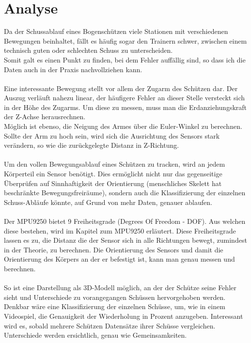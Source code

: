 \section{Analyse}
Da der Schussablauf eines Bogenschützen viele Stationen mit verschiedenen Bewegungen 
beinhaltet, fällt es häufig sogar den Trainern schwer, zwischen einem technisch guten
oder schlechten Schuss zu unterscheiden.\\ 
Somit galt es einen Punkt zu finden, bei dem Fehler auffällig sind, so dass ich die Daten auch in 
der Praxis nachvollziehen kann.\\
\\
Eine interessante Bewegung stellt vor allem der Zugarm des 
Schützen dar. Der Auszug verläuft nahezu linear, der häufigere Fehler 
an dieser Stelle versteckt sich in der Höhe des Zugarms. 
Um diese zu messen, muss man die Erdanziehungskraft der Z-Achse herausrechnen.\\
Möglich ist ebenso, die Neigung des Armes über die Euler-Winkel zu berechnen. Sollte 
der Arm zu hoch sein, wird sich die Ausrichtung des Sensors stark verändern, so wie 
die zurückgelegte Distanz in Z-Richtung.\\
\\
Um den vollen Bewegungsablauf eines Schützen zu tracken, wird an jedem Körperteil ein Sensor
benötigt. Dies ermöglicht nicht nur das gegenseitige Überprüfen auf Sinnhaftigkeit der Orientierung
(menschliches Skelett hat beschränkte Bewegungsfreiräume), sondern auch die Klassifizierung der 
einzelnen Schuss-Abläufe könnte, auf Grund von mehr Daten, genauer ablaufen.\\ 
\\
Der MPU9250 bietet 9 Freiheitsgrade (Degrees Of Freedom - DOF). Aus welchen diese bestehen, wird
im Kapitel zum MPU9250 erläutert. Diese Freiheitsgrade lassen es zu, die Distanz
die der Sensor sich in alle Richtungen bewegt, zumindest in der Theorie, zu berechnen. Die Orientierung des Sensors 
und damit die Orientierung des Körpers an der er befestigt ist, kann man genau messen und berechnen. \\
\\
So ist eine Darstellung als 3D-Modell möglich, an der der Schütze seine Fehler sieht und Unterschiede
zu vorangegangen Schüssen hervorgehoben werden. \\
Denkbar wäre eine Klassifizierung der einzelnen Schüsse, um, wie in einem Videospiel, die Genauigkeit
der Wiederholung in Prozent anzugeben. Interessant wird es, sobald mehrere Schützen Datensätze
ihrer Schüsse vergleichen. Unterschiede werden ersichtlich, genau wie Gemeinsamkeiten. \\
\\

